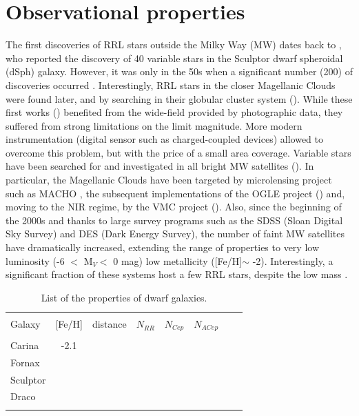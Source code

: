 \documentclass{mem}
\begin{document}
\section{Observational properties}

The first discoveries of RRL stars outside the Milky Way (MW) dates back to \citet{baade39}, who reported the discovery of 40 variable stars in the Sculptor dwarf spheroidal (dSph) galaxy. However, it was only in the 50s when a significant number (200) of discoveries occurred \citep{thackeray50}. Interestingly, RRL stars in the closer Magellanic Clouds were found later, and by searching in their globular cluster system (\citealt{thackeray51, thackeray53, thackeray58, alexander60}). While these first works  (\citealt{baade61, vanagt67,swope67,vanagt68,hodge78, nemec88}) benefited from the wide-field provided by photographic data, they suffered from strong limitations on the limit magnitude. More modern instrumentation (digital sensor such as charged-coupled devices) allowed to overcome this problem, but with the price of a small area coverage. Variable stars have been searched for and investigated in all bright MW satellites (\citealt{nemec88,siegel00,bersier02,dallora03,baldacci05,kinemuchi08,coppola15,martinezvazquez16a}). In particular, the Magellanic Clouds have been targeted by microlensing project such as MACHO \citep{alcock96a}, the subsequent implementations of the OGLE project (\citealt{udalski92,soszynski19a}) and, moving to the NIR regime, by the VMC project (\citet{cioni11}). Also, since the beginning of the 2000s and thanks to large survey programs such as the SDSS (Sloan Digital Sky Survey) and DES (Dark Energy Survey), the number of faint MW satellites have dramatically increased, extending the range of properties to very low luminosity (-6 $<$ M$_V <$ 0 mag) low metallicity ([Fe/H]$\sim$ -2). Interestingly, a significant fraction of these systems host a few RRL stars, despite the low mass \citep{vivas20b}.


\begin{table}
\caption{List of the properties of dwarf galaxies.}
\label{tab:tab1}
\begin{center}
\begin{tabular}{lccccccc}
\hline
\\
Galaxy & [Fe/H] & distance & $N_{RR}$ & $N_{Cep}$ & $N_{ACep}$ &  &  \\
\hline
\\
Carina  & -2.1 &  &  & &  &  & \\
Fornax  & & & & &  &  & \\
Sculptor  & & & & &  &  & \\
Draco   & & & & &  &  & \\
\\
\hline
\end{tabular}
\end{center}
\end{table}
\end{document}

